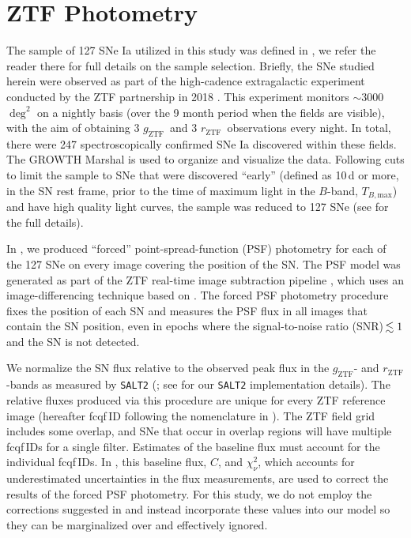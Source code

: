 \documentclass[twocolumn]{aastex63}
\newcommand{\rztf}{$r_\mathrm{ZTF}$}
\newcommand{\gztf}{$g_\mathrm{ZTF}$}
\newcommand{\tbmax}{$T_{B,\mathrm{max}}$}
\begin{document}
\section{ZTF Photometry}\label{sec:ztf}

The sample of 127 SNe Ia utilized in this study was defined in \citet{Yao19},
we refer the reader there for full details on the sample selection. Briefly,
the SNe studied herein were observed as part of the high-cadence extragalactic
experiment conducted by the ZTF partnership in 2018 \citep{Bellm19a}. This
experiment monitors $\sim$3000\,$\deg^2$ on a nightly basis (over the 9 month
period when the fields are visible), with the aim of obtaining 3 \gztf\ and 3
\rztf\ observations every night. In total, there were 247 spectroscopically
confirmed SNe Ia discovered within these fields. The GROWTH Marshal
\citep{Kasliwal19} is used to organize and visualize the data. Following cuts
to limit the sample to SNe that were discovered ``early'' (defined as 10\,d or
more, in the SN rest frame, prior to the time of maximum light in the
$B$-band, \tbmax) and have high quality light curves, the sample was reduced
to 127 SNe (see \citealt{Yao19} for the full details).

In \citet{Yao19}, we produced ``forced'' point-spread-function (PSF) photometry
for each of the 127 SNe on every image covering the position of the SN. The PSF
model was generated as part of the ZTF real-time image subtraction pipeline
\citep{Masci19}, which uses an image-differencing technique based on
\citet{Zackay16}. The forced PSF photometry procedure fixes the position of each
SN and measures the PSF flux in all images that contain the SN position, even in
epochs where the signal-to-noise ratio (SNR)\,$\lesssim 1$ and the SN is not detected.

We normalize the SN flux relative to the observed peak flux in the \gztf- and
\rztf-bands as measured by \texttt{SALT2} (\citealt{Guy07}; see \citealt{Yao19}
for our \texttt{SALT2} implementation details). The relative fluxes produced via
this procedure are unique for every ZTF reference image (hereafter fcqf\,ID
following the nomenclature in \citealt{Yao19}). The ZTF field grid includes some
overlap, and SNe that occur in overlap regions will have multiple fcqf\,IDs for
a single filter. Estimates of the baseline flux must account for the individual
fcqf\,IDs. In \citet{Yao19}, this baseline flux, $C$, and $\chi^2_{\nu}$, which
accounts for underestimated uncertainties in the flux measurements, are used to
correct the results of the forced PSF photometry. For this study, we do not
employ the corrections suggested in \citet{Yao19} and instead incorporate these
values into our model so they can be marginalized over and effectively ignored.
\end{document}
